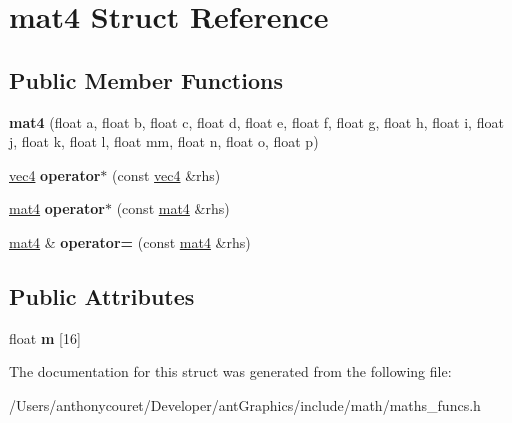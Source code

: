 \hypertarget{structmat4}{\section{mat4 Struct Reference}
\label{structmat4}
}
\subsection*{Public Member Functions}
\begin{DoxyCompactItemize}
\item 
\hypertarget{structmat4_aa23388c850e1826e266a640d914e6119}{{\bfseries mat4} (float a, float b, float c, float d, float e, float f, float g, float h, float i, float j, float k, float l, float mm, float n, float o, float p)}\label{structmat4_aa23388c850e1826e266a640d914e6119}

\item 
\hypertarget{structmat4_ad9b252b1e4b560445d77f839bb420348}{\hyperlink{structvec4}{vec4} {\bfseries operator$\ast$} (const \hyperlink{structvec4}{vec4} \&rhs)}\label{structmat4_ad9b252b1e4b560445d77f839bb420348}

\item 
\hypertarget{structmat4_a0714c730bc200119265535b40b980ee4}{\hyperlink{structmat4}{mat4} {\bfseries operator$\ast$} (const \hyperlink{structmat4}{mat4} \&rhs)}\label{structmat4_a0714c730bc200119265535b40b980ee4}

\item 
\hypertarget{structmat4_a46f9423bc631b42ea4df454e12177f87}{\hyperlink{structmat4}{mat4} \& {\bfseries operator=} (const \hyperlink{structmat4}{mat4} \&rhs)}\label{structmat4_a46f9423bc631b42ea4df454e12177f87}

\end{DoxyCompactItemize}
\subsection*{Public Attributes}
\begin{DoxyCompactItemize}
\item 
\hypertarget{structmat4_ab424bc8677a83f16bd30f4eaaecb6d3a}{float {\bfseries m} \mbox{[}16\mbox{]}}\label{structmat4_ab424bc8677a83f16bd30f4eaaecb6d3a}

\end{DoxyCompactItemize}


The documentation for this struct was generated from the following file\+:\begin{DoxyCompactItemize}
\item 
/\+Users/anthonycouret/\+Developer/ant\+Graphics/include/math/maths\+\_\+funcs.\+h\end{DoxyCompactItemize}
